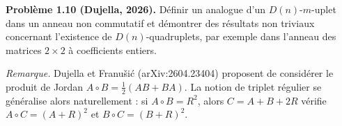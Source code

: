 \textbf{Problème 1.10 (Dujella, 2026).} Définir un analogue d'un $D(n)$-$m$-uplet dans un anneau non commutatif et démontrer des résultats non triviaux concernant l'existence de $D(n)$-quadruplets, par exemple dans l'anneau des matrices $2\times 2$ à coefficients entiers.

\medskip

\textit{Remarque.} Dujella et Franušić (arXiv:2604.23404) proposent de considérer le produit de Jordan $A \circ B = \frac{1}{2}(AB+BA)$. La notion de triplet régulier se généralise alors naturellement : si $A \circ B = R^2$, alors $C = A+B+2R$ vérifie $A \circ C = (A+R)^2$ et $B \circ C = (B+R)^2$.

